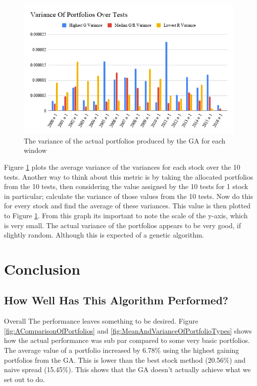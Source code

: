 \documentclass[11pt]{article}
\begin{document}
    \begin{figure}[H] %
        \includegraphics[width=\textwidth]{VarianceOfPortfoliosOverTests}
        \caption{The variance of the actual portfolios produced by the GA for each window}
            \label{fig:VarianceOfPortfoliosOverTests}
    \end{figure}

    Figure \ref{fig:VarianceOfPortfoliosOverTests} plots the average variance of the variances for
    each stock over the 10 tests. Another way to think about this metric is by taking the allocated
    portfolios from the 10 tests, then considering the value assigned by the 10 tests for 1 stock in
    particular; calculate the variance of those values from the 10 tests. Now do this for every stock and find the
    average of these variances. This value is then plotted to Figure
    \ref{fig:VarianceOfPortfoliosOverTests}. From this graph its important to note the scale of
    the y-axis, which is very small. The actual variance of the portfolios appears to be very
    good, if slightly random. Although this is expected of a genetic algorithm.

\section{Conclusion}

\subsection{How Well Has This Algorithm Performed?}

    Overall The performance leaves something to be desired. Figure
    \ref{fig:AComparisonOfPortfolios} and \ref{fig:MeanAndVarianceOfPortfolioTypes}
    shows how the actual performance was
    sub par compared to some very basic portfolios. The average value of a portfolio
    increased by 6.78\% using the highest gaining portfolios from the GA. This is lower
    than the best stock method (20.56\%) and naive spread (15.45\%). This shows
    that the GA doesn't actually achieve what we set out to do.
\end{document}
